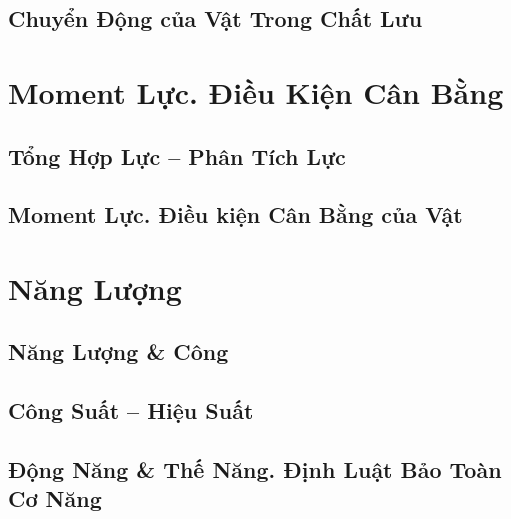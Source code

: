 \documentclass[oneside]{book}
\numberwithin{equation}{section}
\begin{document}
\section{Chuyển Động của Vật Trong Chất Lưu}


\chapter{Moment Lực. Điều Kiện Cân Bằng}

\section{Tổng Hợp Lực -- Phân Tích Lực}


\section{Moment Lực. Điều kiện Cân Bằng của Vật}


\chapter{Năng Lượng}

\section{Năng Lượng \& Công}


\section{Công Suất -- Hiệu Suất}


\section{Động Năng \& Thế Năng. Định Luật Bảo Toàn Cơ Năng}

\end{document}
